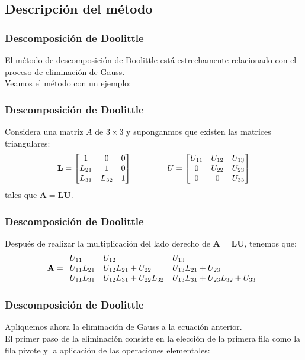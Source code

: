 \subsection{Descripción del método}
\begin{frame}
\frametitle{Descomposición de Doolittle}
El método de descomposición de Doolittle está estrechamente relacionado con el proceso de eliminación de Gauss.
\\
\bigskip
Veamos el método con un ejemplo:
\end{frame}
\begin{frame}[fragile]
\frametitle{Descomposición de Doolittle}
Considera una matriz $A$ de $3 \times 3$ y suponganmos que existen las matrices triangulares:
\[ \mathbf{L} =
	\begin{bmatrix}
		1 & 0 & 0 \\
		L_{21} & 1 & 0 \\
		L_{31} & L_{32} & 1
	\end{bmatrix}
	\hspace{1.5cm} U =
	\begin{bmatrix}
		U_{11} & U_{12} & U_{13} \\
		0 & U_{22} & U_{23} \\
		0 & 0 & U_{33}
	\end{bmatrix} \]
tales que $\mathbf{A = LU}$.
\end{frame}
\begin{frame}
\frametitle{Descomposición de Doolittle}
Después de realizar la multiplicación del lado derecho de $\mathbf{A = LU}$, tenemos que:
\fontsize{12}{12}\selectfont
\[ \mathbf{A} =
	\begin{array}{l l l}
		U_{11} & U_{12} & U_{13} \\
		U_{11}L_{21} & U_{12}L_{21} + U_{22} & U_{13}L_{21} + U_{23} \\
		U_{11}L_{31} & U_{12}L_{31} + U_{22}L_{32} & U_{13}L_{31} + U_{23}L_{32} + U_{33}
	\end{array} \]
\end{frame}
\begin{frame}[fragile]
\frametitle{Descomposición de Doolittle}
Apliquemos ahora la eliminación de Gauss a la ecuación anterior. 
\\
\bigskip
El primer paso de la eliminación  consiste en la elección de la primera fila como la fila pivote y la aplicación de las operaciones elementales:
\end{frame}
